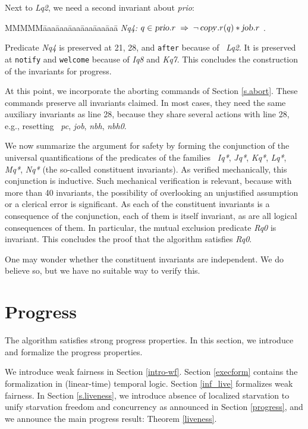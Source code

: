 \documentclass[10pt]{article} \usepackage[english]{babel}
\newenvironment{tab}{\begin{tabbing}
MMMMM\=aaa\=aaa\=aaa\=aaa\=aaa\=aaa\= \kill}{\end{tabbing}}
\def\S #1/{\mbox {\textsl{#1}}}
\def\T #1/{\mbox {\texttt{#1}}}
\def\Implies{\;\Rightarrow\;}
\begin{document}
Next to \S Lq2/, we need a second invariant about \S prio/:
\begin{tab}
\S Nq4:/ \> $ q\in \S prio/.r \Implies \neg\,\S copy/.r(q) * \S job/.r $ .
\end{tab}
Predicate \S Nq4/ is preserved at 21, 28, and \T after/ because of \S
Lq2/. It is preserved at \T notify/ and \T welcome/ because of \S Iq8/
and \S Kq7/.  This concludes the construction of the invariants for
progress.

At this point, we incorporate the aborting commands of Section
\ref{s.abort}.  These commands preserve all invariants claimed.  In
most cases, they need the same auxiliary invariants as line 28,
because they share several actions with line 28, e.g., resetting \S
pc/, \S job/, \S nbh/, \S nbh0/.

We now summarize the argument for safety by forming the conjunction of
the universal quantifications of the predicates of the families \S
Iq*/, \S Jq*/, \S Kq*/, \S Lq*/, \S Mq*/, \S Nq*/ (the so-called
constituent invariants).  As verified mechanically, this conjunction
is inductive.  Such mechanical verification is relevant, because with
more than 40 invariants, the possibility of overlooking an unjustified
assumption or a clerical error is significant.  As each of the
constituent invariants is a consequence of the conjunction, each of
them is itself invariant, as are all logical consequences of them. In
particular, the mutual exclusion predicate \S Rq0/ is invariant.  This
concludes the proof that the algorithm satisfies \S Rq0/.

One may wonder whether the constituent invariants are independent. We
do believe so, but we have no suitable way to verify this. 

\section{Progress} \label{nodead}

The algorithm satisfies strong progress properties.  In this
section, we introduce and formalize the progress properties.

We introduce weak fairness in Section \ref{intro-wf}.  Section
\ref{execform} contains the formalization in (linear-time) temporal
logic.  Section \ref{inf_live} formalizes weak fairness.  
In Section \ref {s.liveness}, we introduce absence of localized
starvation to unify starvation freedom and concurrency as announced in
Section \ref{progress}, and we announce the main progress result: 
Theorem \ref{liveness}. 
\end{document}
